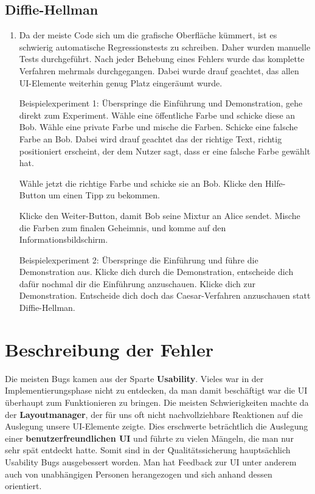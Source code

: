 \documentclass{article}
\begin{document}
  \subsection{Diffie-Hellman}
	  \begin{enumerate}
	      \item Da der meiste Code sich um die grafische Oberfläche kümmert, ist es schwierig
	          automatische Regressionstests zu schreiben. Daher wurden manuelle Tests durchgeführt.
	          Nach jeder Behebung eines Fehlers wurde das komplette Verfahren mehrmals durchgegangen.
	          Dabei wurde drauf geachtet, das allen UI-Elemente weiterhin genug Platz eingeräumt wurde.
	
	          Beispielexperiment 1:
	          Überspringe die Einführung und Demonstration, gehe direkt zum Experiment.
	          Wähle eine öffentliche Farbe und schicke diese an Bob.
	          Wähle eine private Farbe und mische die Farben. Schicke eine falsche
	          Farbe an Bob. Dabei wird drauf geachtet das der richtige Text, richtig positioniert
	          erscheint, der dem Nutzer sagt, dass er eine falsche Farbe gewählt hat.
	
	          Wähle jetzt die richtige Farbe und schicke sie an Bob.
	          Klicke den Hilfe-Button um einen Tipp zu bekommen.
	          
	          Klicke den Weiter-Button, damit Bob seine Mixtur an Alice sendet.
	          Mische die Farben zum finalen Geheimnis, und komme auf den Informationsbildschirm.
	
	          Beispielexperiment 2:
	          Überspringe die Einführung und führe die Demonstration aus.
	          Klicke dich durch die Demonstration, entscheide dich dafür
	          nochmal dir die Einführung anzuschauen. Klicke dich zur Demonstration.
	          Entscheide dich doch das Caesar-Verfahren anzuschauen statt Diffie-Hellman.
	      \end{enumerate}
		

\section{Beschreibung der Fehler}
  Die meisten Bugs kamen aus der Sparte \textbf{Usability}. Vieles war in der Implementierungsphase nicht zu entdecken, da man damit beschäftigt
  war die UI überhaupt zum Funktionieren zu bringen. Die meisten Schwierigkeiten machte da der \textbf{Layoutmanager}, der für uns oft nicht
  nachvollziehbare Reaktionen auf die Auslegung unsere UI-Elemente zeigte.\newline 
  Dies erschwerte beträchtlich die Auslegung einer \textbf{benutzerfreundlichen UI} und führte zu vielen Mängeln, die man
  nur sehr spät entdeckt hatte. Somit sind in der Qualitätssicherung hauptsächlich Usability Bugs ausgebessert worden. 
  Man hat Feedback zur UI unter anderem auch von unabhängigen Personen herangezogen und sich anhand dessen orientiert. 
  
\end{document}
